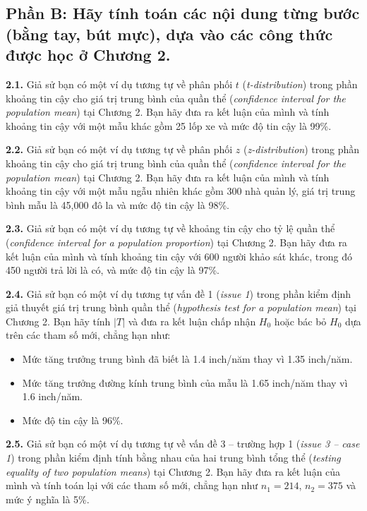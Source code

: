 \newpage
\subsection*{Phần B: Hãy tính toán các nội dung từng bước (bằng tay, bút mực), dựa vào các công thức được học ở Chương 2.}

\textbf{2.1.} Giả sử bạn có một ví dụ tương tự về phân phối $t$ (\textit{t-distribution}) trong phần khoảng tin cậy cho giá trị trung bình của quần thể (\textit{confidence interval for the population mean}) tại Chương 2.  
Bạn hãy đưa ra kết luận của mình và tính khoảng tin cậy với một mẫu khác gồm 25 lốp xe và mức độ tin cậy là 99\%.

\textbf{2.2.} Giả sử bạn có một ví dụ tương tự về phân phối $z$ (\textit{z-distribution}) trong phần khoảng tin cậy cho giá trị trung bình của quần thể (\textit{confidence interval for the population mean}) tại Chương 2.  
Bạn hãy đưa ra kết luận của mình và tính khoảng tin cậy với một mẫu ngẫu nhiên khác gồm 300 nhà quản lý, giá trị trung bình mẫu là 45{,}000 đô la và mức độ tin cậy là 98\%.

\textbf{2.3.} Giả sử bạn có một ví dụ tương tự về khoảng tin cậy cho tỷ lệ quần thể (\textit{confidence interval for a population proportion}) tại Chương 2.  
Bạn hãy đưa ra kết luận của mình và tính khoảng tin cậy với 600 người khảo sát khác, trong đó 450 người trả lời là có, và mức độ tin cậy là 97\%.

\textbf{2.4.} Giả sử bạn có một ví dụ tương tự vấn đề 1 (\textit{issue 1}) trong phần kiểm định giả thuyết giá trị trung bình quần thể (\textit{hypothesis test for a population mean}) tại Chương 2.  
Bạn hãy tính $|T|$ và đưa ra kết luận chấp nhận $H_0$ hoặc bác bỏ $H_0$ dựa trên các tham số mới, chẳng hạn như:
\begin{itemize}
\item Mức tăng trưởng trung bình đã biết là 1.4 inch/năm thay vì 1.35 inch/năm.
\item Mức tăng trưởng đường kính trung bình của mẫu là 1.65 inch/năm thay vì 1.6 inch/năm.
\item Mức độ tin cậy là 96\%.
\end{itemize}

\textbf{2.5.} Giả sử bạn có một ví dụ tương tự về vấn đề 3 -- trường hợp 1 (\textit{issue 3 -- case 1}) trong phần kiểm định tính bằng nhau của hai trung bình tổng thể (\textit{testing equality of two population means}) tại Chương 2.  
Bạn hãy đưa ra kết luận của mình và tính toán lại với các tham số mới, chẳng hạn như $n_1 = 214$, $n_2 = 375$ và mức ý nghĩa là 5\%.

